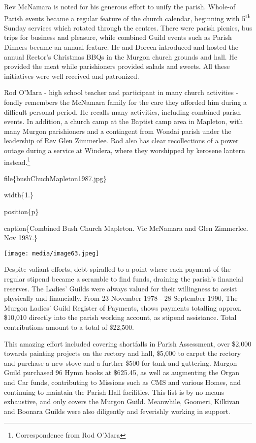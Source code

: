 Rev McNamara is noted for his generous effort to unify the parish. Whole-of Parish events became a regular feature of the church calendar, beginning with 5\textsuperscript{th} Sunday services which rotated through the centres. There were parish picnics, bus trips for business and pleasure, while combined Guild events such as Parish Dinners became an annual feature. He and Doreen introduced and hosted the annual Rector's Christmas BBQs in the Murgon church grounds and hall. He provided the meat while parishioners provided salads and sweets. All these initiatives were well received and patronized.

Rod O'Mara - high school teacher and participant in many church activities - fondly remembers the McNamara family for the care they afforded him during a difficult personal period. He recalls many activities, including combined parish events. In addition, a church camp at the Baptist camp area in Mapleton, with many Murgon parishioners and a contingent from Wondai parish under the leadership of Rev Glen Zimmerlee. Rod also has clear recollections of a power outage during a service at Windera, where they worshipped by kerosene lantern instead.\footnote{Correspondence from Rod O'Mara}

file\{bushChuchMapleton1987.jpg\}

width\{1.\}

position\{p\}

caption\{Combined Bush Church Mapleton. Vic McNamara and Glen Zimmerlee. Nov 1987.\}

\texttt{[image: media/image63.jpeg]}

Despite valiant efforts, debt spiralled to a point where each payment of the regular stipend became a scramble to find funds, draining the parish's financial reserves. The Ladies' Guilds were always valued for their willingness to assist physically and financially. From 23 November 1978 - 28 September 1990, The Murgon Ladies' Guild Register of Payments, shows payments totalling approx. \$10,010 directly into the parish working account, as stipend assistance. Total contributions amount to a total of \$22,500.

This amazing effort included covering shortfalls in Parish Assessment, over \$2,000 towards painting projects on the rectory and hall, \$5,000 to carpet the rectory and purchase a new stove and a further \$500 for tank and guttering. Murgon Guild purchased 96 Hymn books at \$625.45, as well as augmenting the Organ and Car funds, contributing to Missions such as CMS and various Homes, and continuing to maintain the Parish Hall facilities. This list is by no means exhaustive, and only covers the Murgon Guild. Meanwhile, Goomeri, Kilkivan and Boonara Guilds were also diligently and feverishly working in support.


